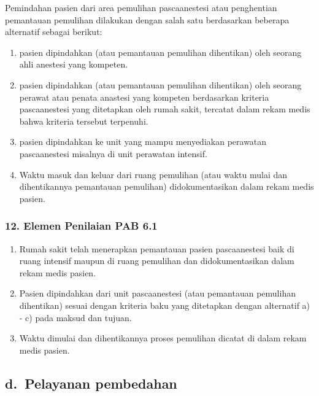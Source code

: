 \documentclass[
]{book}
\providecommand{\tightlist}{%
  \setlength{\itemsep}{0pt}\setlength{\parskip}{0pt}}
\begin{document}
Pemindahan pasien dari area pemulihan pascaanestesi atau penghentian pemantauan pemulihan dilakukan dengan salah satu berdasarkan beberapa alternatif sebagai berikut:

\begin{enumerate}
\def\labelenumi{\alph{enumi}.}
\tightlist
\item
  pasien dipindahkan (atau pemantauan pemulihan dihentikan) oleh seorang ahli anestesi yang kompeten.
\item
  pasien dipindahkan (atau pemantauan pemulihan dihentikan) oleh seorang perawat atau penata anastesi yang kompeten berdasarkan kriteria pascaanestesi yang ditetapkan oleh rumah sakit, tercatat dalam rekam medis bahwa kriteria tersebut terpenuhi.
\item
  pasien dipindahkan ke unit yang mampu menyediakan perawatan pascaanestesi misalnya di unit perawatan intensif.
\item
  Waktu masuk dan keluar dari ruang pemulihan (atau waktu mulai dan dihentikannya pemantauan pemulihan) didokumentasikan dalam rekam medis pasien.
\end{enumerate}

\hypertarget{elemen-penilaian-pab-6.1}{%
\subsubsection*{12. Elemen Penilaian PAB 6.1}\label{elemen-penilaian-pab-6.1}}

\begin{enumerate}
\def\labelenumi{\alph{enumi}.}
\tightlist
\item
  Rumah sakit telah menerapkan pemantauan pasien pascaanestesi baik di ruang intensif maupun di ruang pemulihan dan didokumentasikan dalam rekam medis pasien.
\item
  Pasien dipindahkan dari unit pascaanestesi (atau pemantauan pemulihan dihentikan) sesuai dengan kriteria baku yang ditetapkan dengan alternatif a) - c) pada maksud dan tujuan.
\item
  Waktu dimulai dan dihentikannya proses pemulihan dicatat di dalam rekam medis pasien.
\end{enumerate}

\hypertarget{d.-pelayanan-pembedahan}{%
\subsection*{d.~Pelayanan pembedahan}\label{d.-pelayanan-pembedahan}}
\end{document}
